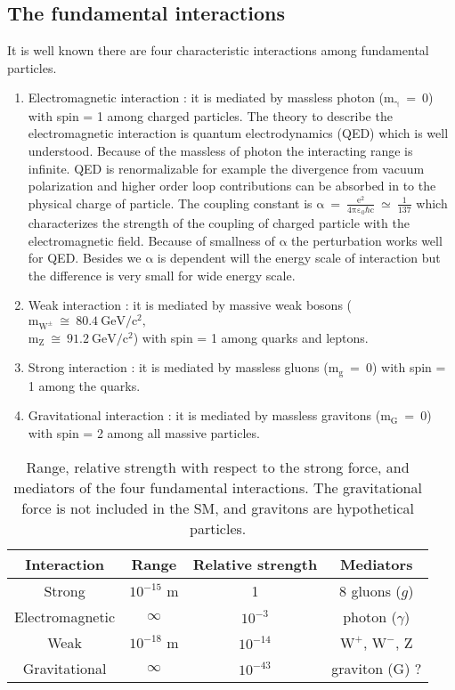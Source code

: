 \subsection{The fundamental interactions}\label{subsec:fund_interaction}
It is well known there are four characteristic interactions among fundamental particles.
\begin{enumerate}
\item Electromagnetic interaction : it is mediated by massless photon ($\mathrm{m_{\gamma}~=~0}$) with spin = 1 among charged particles. The theory to describe the electromagnetic interaction is quantum electrodynamics (QED) which is well understood. Because of the massless of photon the interacting range is infinite. QED is renormalizable for example the divergence from vacuum polarization and higher order loop contributions can be absorbed in to the physical charge of particle. The coupling constant is $\mathrm{\alpha~=~\frac{e^{2}}{4\pi\varepsilon_{0}\hbar c}} ~\simeq ~ \frac{1}{137}$ which characterizes the strength of the coupling of charged particle with the electromagnetic field. Because of smallness of $\mathrm{\alpha}$ the perturbation works well for QED. Besides we $\mathrm{\alpha}$ is dependent will the energy scale of interaction but the difference is very small for wide energy scale.
\item Weak interaction : it is mediated by massive weak bosons ($\mathrm{m_{W^{\pm}}~\cong~80.4~GeV/c^{2},}$ \\ $\mathrm{m_{Z}~\cong~91.2~GeV/c^{2}}$) with spin = 1 among quarks and leptons.
\item Strong interaction : it is mediated by massless gluons ($\mathrm{m_{g}~=~0}$) with spin = 1 among the quarks. 
\item Gravitational interaction : it is mediated by massless gravitons ($\mathrm{m_{G}~=~0}$) with spin = 2 among all massive particles.
\end{enumerate}

 \begin{table}[!hbpt]
 \begin{center}
 \begin{tabular}{c|c|c|c}
 \hline
 Interaction & Range & Relative strength & Mediators \\
 \hline
 Strong & $10^{-15}$ m & 1 &  8 gluons ($g$) \\
 \hline
 Electromagnetic & $\infty$ & $10^{-3}$ & photon ($\gamma$) \\
 \hline
 Weak &  $10^{-18}$ m & $10^{-14}$ & $\mathrm{W^+}$, $\mathrm{W^-}$, $\mathrm{Z}$ \\
 \hline
 Gravitational & $\infty$ & $10^{-43}$ & graviton (G) ? \\
 \hline
  \end{tabular}
 \end{center}
 \caption{Range, relative strength with respect to the strong force, and mediators of the four fundamental interactions. The gravitational force is not included in the SM, and gravitons are hypothetical particles.
 \label{tab:interactions}
}
 \end{table}



